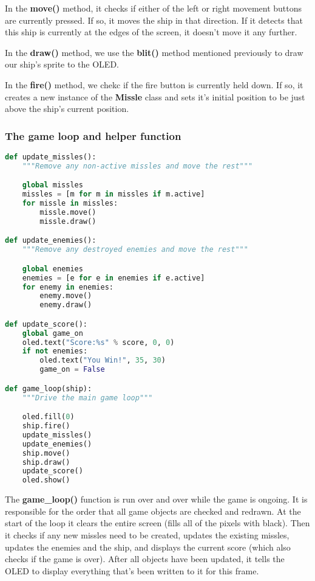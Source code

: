 In the \textbf{move()} method, it checks if either of the left or right movement buttons are currently
pressed. If so, it moves the ship in that direction. If it detects that this ship is currently at the
edges of the screen, it doesn't move it any further.

In the \textbf{draw()} method, we use the \textbf{blit()} method mentioned previously to draw our ship's sprite to the OLED.

In the \textbf{fire()} method, we chekc if the fire button is currently held down. If so, it creates a new
instance of the \textbf{Missle} class and sets it's initial position to be just above the ship's current position.

\subsubsection{The game loop and helper function}
\begin{lstlisting}[language=Python,caption=The game loop and helper functions]
def update_missles():
    """Remove any non-active missles and move the rest"""

    global missles
    missles = [m for m in missles if m.active]
    for missle in missles:
        missle.move()
        missle.draw()

def update_enemies():
    """Remove any destroyed enemies and move the rest"""

    global enemies
    enemies = [e for e in enemies if e.active]
    for enemy in enemies:
        enemy.move()
        enemy.draw()

def update_score():
    global game_on
    oled.text("Score:%s" % score, 0, 0)
    if not enemies:
        oled.text("You Win!", 35, 30)
        game_on = False

def game_loop(ship):
    """Drive the main game loop"""

    oled.fill(0)
    ship.fire()
    update_missles()
    update_enemies()
    ship.move()
    ship.draw()
    update_score()
    oled.show()
\end{lstlisting}

The \textbf{game\_loop()} function is run over and over while the game is ongoing. It is responsible for
the order that all game objects are checked and redrawn. At the start of the loop it clears the entire
screen (fills all of the pixels with black). Then it checks if any new missles need to be created, updates
the existing missles, updates the enemies and the ship, and displays the current score (which also checks
if the game is over). After all objects have been updated, it tells the OLED to display everything that's
been written to it for this frame.

